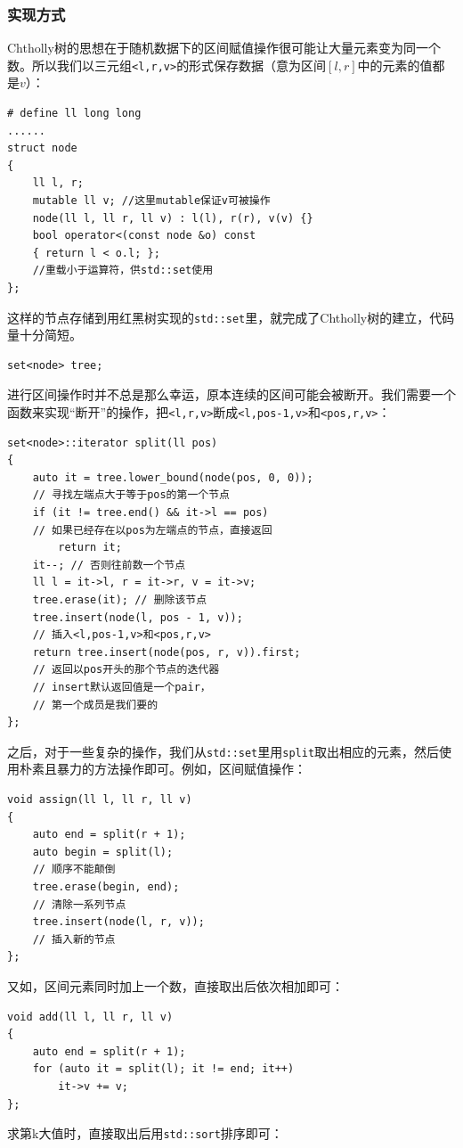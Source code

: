 \documentclass{cjc}
\begin{document}
\subsubsection{实现方式}
Chtholly树的思想在于随机数据下的区间赋值操作很可能让大量元素变为同一个数。所以我们以三元组\lstinline{<l,r,v>}的形式保存数据（意为区间$[l,r]$中的元素的值都是$v$）：
\begin{lstlisting}
# define ll long long
......
struct node
{
    ll l, r;
    mutable ll v; //这里mutable保证v可被操作
    node(ll l, ll r, ll v) : l(l), r(r), v(v) {} 
    bool operator<(const node &o) const 
    { return l < o.l; };
    //重载小于运算符，供std::set使用
};
\end{lstlisting}
这样的节点存储到用红黑树实现的\lstinline{std::set}里，就完成了Chtholly树的建立，代码量十分简短。
\begin{lstlisting}
set<node> tree;
\end{lstlisting}
进行区间操作时并不总是那么幸运，原本连续的区间可能会被断开。我们需要一个函数来实现“断开”的操作，把\lstinline{<l,r,v>}断成\lstinline{<l,pos-1,v>}和\lstinline{<pos,r,v>}：
\begin{lstlisting}
set<node>::iterator split(ll pos)
{
    auto it = tree.lower_bound(node(pos, 0, 0)); 
    // 寻找左端点大于等于pos的第一个节点
    if (it != tree.end() && it->l == pos) 
    // 如果已经存在以pos为左端点的节点，直接返回
        return it;
    it--; // 否则往前数一个节点
    ll l = it->l, r = it->r, v = it->v;
    tree.erase(it); // 删除该节点
    tree.insert(node(l, pos - 1, v)); 
    // 插入<l,pos-1,v>和<pos,r,v>
    return tree.insert(node(pos, r, v)).first; 
    // 返回以pos开头的那个节点的迭代器
    // insert默认返回值是一个pair，
    // 第一个成员是我们要的
};
\end{lstlisting}
之后，对于一些复杂的操作，我们从\lstinline{std::set}里用\lstinline{split}取出相应的元素，然后使用朴素且暴力的方法操作即可。例如，区间赋值操作：
\begin{lstlisting}
void assign(ll l, ll r, ll v)
{
    auto end = split(r + 1);
    auto begin = split(l); 
    // 顺序不能颠倒
    tree.erase(begin, end); 
    // 清除一系列节点
    tree.insert(node(l, r, v)); 
    // 插入新的节点
};
\end{lstlisting}
又如，区间元素同时加上一个数，直接取出后依次相加即可：
\begin{lstlisting}
void add(ll l, ll r, ll v)
{
    auto end = split(r + 1);
    for (auto it = split(l); it != end; it++)
        it->v += v;
};
\end{lstlisting}
求第k大值时，直接取出后用\lstinline{std::sort}排序即可：
\end{document}
